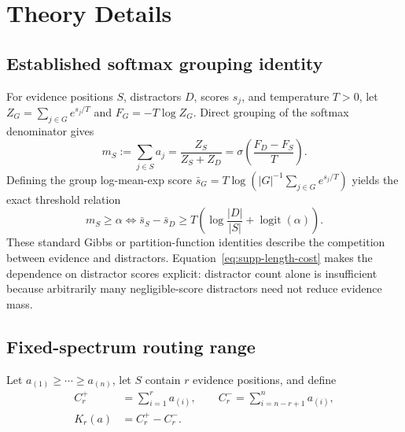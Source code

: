 \documentclass[letterpaper]{article} %
\begin{document}
\section{Theory Details}

\subsection{Established softmax grouping identity}

For evidence positions $S$, distractors $D$, scores $s_j$, and temperature $T>0$, let
$Z_G=\sum_{j\in G}e^{s_j/T}$ and $F_G=-T\log Z_G$. Direct grouping of the softmax denominator gives
\begin{equation}
m_S:=\sum_{j\in S}a_j
=\frac{Z_S}{Z_S+Z_D}
=\sigma\!\left(\frac{F_D-F_S}{T}\right).
\label{eq:supp-free-energy}
\end{equation}
Defining the group log-mean-exp score
$\bar s_G=T\log(|G|^{-1}\sum_{j\in G}e^{s_j/T})$ yields the exact threshold relation
\begin{equation}
m_S\ge\alpha
\Longleftrightarrow
\bar s_S-\bar s_D\ge
T\left(\log\frac{|D|}{|S|}+\operatorname{logit}(\alpha)\right).
\label{eq:supp-length-cost}
\end{equation}
These standard Gibbs or partition-function identities \citep{ramsauer2021hopfield} describe the competition
between evidence and distractors. Equation~\ref{eq:supp-length-cost} makes the dependence on distractor scores
explicit: distractor count alone is insufficient because arbitrarily many negligible-score distractors need
not reduce evidence mass.

\subsection{Fixed-spectrum routing range}

Let $a_{(1)}\ge\cdots\ge a_{(n)}$, let $S$ contain $r$ evidence positions, and define
\begin{equation}
\begin{aligned}
C_r^+&=\sum_{i=1}^ra_{(i)},\qquad
C_r^-=\sum_{i=n-r+1}^na_{(i)},\\
K_r(a)&=C_r^+-C_r^-.
\end{aligned}
\end{equation}
\end{document}
